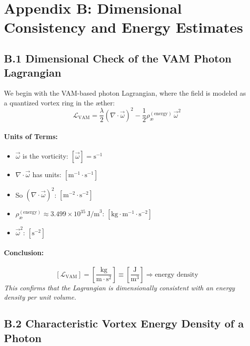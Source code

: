 \section*{Appendix B: Dimensional Consistency and Energy Estimates}\label{appendix:energy-check}

\subsection*{B.1 Dimensional Check of the VAM Photon Lagrangian}

We begin with the VAM-based photon Lagrangian, where the field is modeled as a quantized vortex ring in the æther:
\[
    \mathcal{L}_{\text{VAM}} = \frac{\lambda}{2} \left( \nabla \cdot \vec{\omega} \right)^2 - \frac{1}{2} \rho_\text{\ae}^{(\text{energy})} \, \vec{\omega}^2
\]

\paragraph{Units of Terms:}
\begin{itemize}
    \item $\vec{\omega}$ is the vorticity: $[\vec{\omega}] = \text{s}^{-1}$
    \item $\nabla \cdot \vec{\omega}$ has units: $[\text{m}^{-1} \cdot \text{s}^{-1}]$
    \item So $(\nabla \cdot \vec{\omega})^2$: $[\text{m}^{-2} \cdot \text{s}^{-2}]$
    \item $\rho_\text{\ae}^{(\text{energy})} \approx 3.499 \times 10^{35} \, \text{J/m}^3$: $[\text{kg} \cdot \text{m}^{-1} \cdot \text{s}^{-2}]$
    \item $\vec{\omega}^2$: $[\text{s}^{-2}]$
\end{itemize}

\paragraph{Conclusion:}
\[
    [\mathcal{L}_{\text{VAM}}] = \left[ \frac{\text{kg}}{\text{m} \cdot \text{s}^{2}} \right] \equiv \left[ \frac{\text{J}}{\text{m}^{3}} \right] \Rightarrow \text{energy density}
\]
\emph{This confirms that the Lagrangian is dimensionally consistent with an energy density per unit volume.}

\vspace{1em}

\subsection*{B.2 Characteristic Vortex Energy Density of a Photon}

